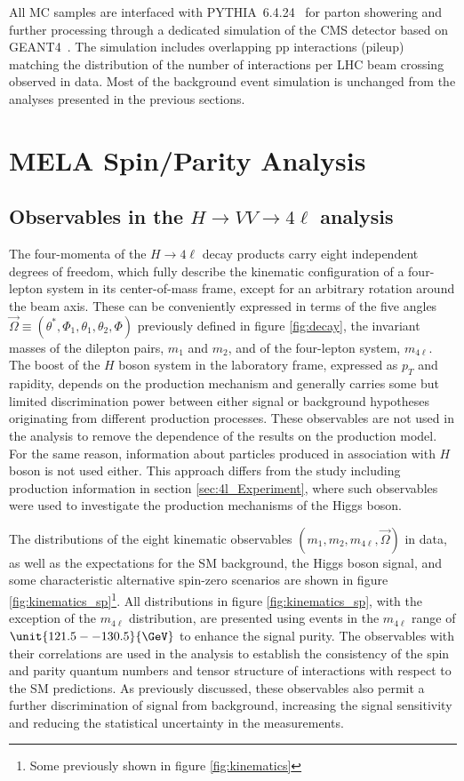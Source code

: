 All MC samples are interfaced with \textsc{PYTHIA}~6.4.24~\cite{Sjostrand:2006za} for parton showering and further processing through a dedicated simulation of the CMS detector based on \textsc{GEANT4}~\cite{Agostinelli2003250}. The simulation includes overlapping pp interactions (pileup) matching the distribution of the number of interactions per LHC beam crossing observed in data. Most of the background event simulation is unchanged from the analyses presented in the previous sections.


\section{MELA Spin/Parity Analysis}
\label{sec:MELA_SpinParity}

\subsection{Observables in the $H \to VV \to 4\ell$ analysis}
\label{sec:Observables_spinparity}

The four-momenta of the $H \to 4\ell$ decay products carry eight independent degrees of freedom,
which fully describe the kinematic configuration of a four-lepton system in its center-of-mass frame, except for an arbitrary
rotation around the beam axis. These can be conveniently expressed in terms of the five angles
$\vec\Omega\equiv(\theta^*, \Phi_1, \theta_1, \theta_2, \Phi)$ previously defined in figure \ref{fig:decay}, the invariant masses of the dilepton pairs, $m_{1}$ and $m_2$, and of the four-lepton system, $m_{4\ell}$.
The boost of the $H$ boson system in the laboratory frame, expressed as $p_{T}$ and rapidity, depends on the production
mechanism and generally carries some but limited discrimination power between either signal or background
hypotheses originating from different production processes. These observables are not used in the analysis
to remove the dependence of the results on the production model. For the same reason, information about particles
produced in association with $H$ boson is not used either. This approach differs from the study including production information in section \ref{sec:4l_Experiment}, where such observables were used to investigate the production mechanisms of the Higgs boson.

The distributions of the eight kinematic observables $(m_1, m_2, m_{4\ell}, \vec\Omega)$ in data,
as well as the expectations for the SM background, the Higgs boson signal, and some characteristic alternative
spin-zero scenarios are shown in figure \ref{fig:kinematics_sp}\footnote{Some previously shown in figure \ref{fig:kinematics}}. All distributions in figure \ref{fig:kinematics_sp}, with the exception of the $m_{4\ell}$ distribution, are presented using events in the $m_{4\ell}$ range of $\unit{121.5--130.5}{\GeV}$ to enhance the signal purity. The observables with their correlations are used in the analysis to establish the consistency of the spin and parity quantum numbers and tensor structure of interactions with respect to the SM predictions. As previously discussed, these observables also permit a further discrimination of signal from background, increasing the signal sensitivity and reducing the statistical uncertainty in the measurements.

